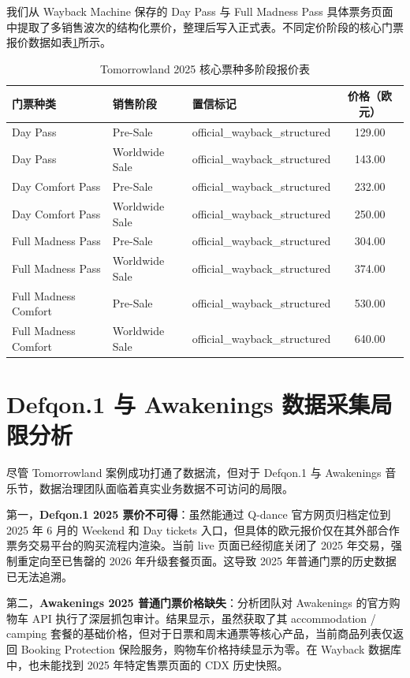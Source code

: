 \documentclass[11pt,a4paper,fontset=fandol]{ctexart}
\begin{document}
我们从 Wayback Machine 保存的 Day Pass 与 Full Madness Pass 具体票务页面中提取了多销售波次的结构化票价，整理后写入正式表。不同定价阶段的核心门票报价数据如表\ref{tab:tomorrowland_prices}所示。

\begin{table}[H]
\centering
\caption{Tomorrowland 2025 核心票种多阶段报价表}
\label{tab:tomorrowland_prices}
\begin{tabular}{lllc}
\toprule
门票种类 & 销售阶段 & 置信标记 & 价格（欧元） \\
\midrule
Day Pass & Pre-Sale & official\_wayback\_structured & 129.00 \\
Day Pass & Worldwide Sale & official\_wayback\_structured & 143.00 \\
Day Comfort Pass & Pre-Sale & official\_wayback\_structured & 232.00 \\
Day Comfort Pass & Worldwide Sale & official\_wayback\_structured & 250.00 \\
Full Madness Pass & Pre-Sale & official\_wayback\_structured & 304.00 \\
Full Madness Pass & Worldwide Sale & official\_wayback\_structured & 374.00 \\
Full Madness Comfort & Pre-Sale & official\_wayback\_structured & 530.00 \\
Full Madness Comfort & Worldwide Sale & official\_wayback\_structured & 640.00 \\
\bottomrule
\end{tabular}
\end{table}

\section{Defqon.1 与 Awakenings 数据采集局限分析}

尽管 Tomorrowland 案例成功打通了数据流，但对于 Defqon.1 与 Awakenings 音乐节，数据治理团队面临着真实业务数据不可访问的局限。

第一，\textbf{Defqon.1 2025 票价不可得}：虽然能通过 Q-dance 官方网页归档定位到 2025 年 6 月的 Weekend 和 Day tickets 入口，但具体的欧元报价仅在其外部合作票务交易平台的购买流程内渲染。当前 live 页面已经彻底关闭了 2025 年交易，强制重定向至已售罄的 2026 年升级套餐页面。这导致 2025 年普通门票的历史数据已无法追溯。

第二，\textbf{Awakenings 2025 普通门票价格缺失}：分析团队对 Awakenings 的官方购物车 API 执行了深层抓包审计。结果显示，虽然获取了其 accommodation / camping 套餐的基础价格，但对于日票和周末通票等核心产品，当前商品列表仅返回 Booking Protection 保险服务，购物车价格持续显示为零。在 Wayback 数据库中，也未能找到 2025 年特定售票页面的 CDX 历史快照。
\end{document}
